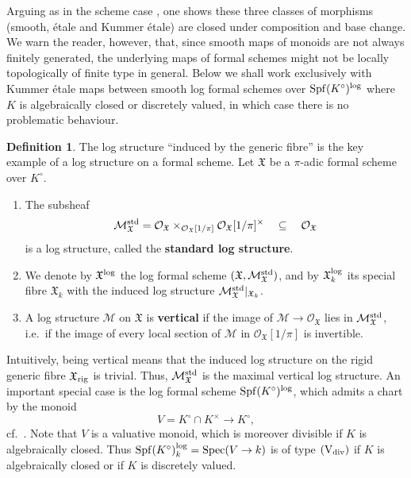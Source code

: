 \documentclass[a4paper,twoside,11pt,reqno]{amsart}
\newcommand{\cM}{{\mathcal M}}
\newcommand{\cO}{{\mathcal O}}
\newcommand{\fX}{{\mathfrak{X}}}
\newcommand{\la}{\longrightarrow}
\DeclareMathOperator{\Spec}{Spec}
\DeclareMathOperator{\Spf}{Spf}
\newcommand{\typeVd}{(\mathrm{V}_{\rm div})}
\theoremstyle{definition}
\newtheorem{defi}[thm]{Definition}
\numberwithin{equation}{subsection}
\begin{document}
Arguing as in the scheme case \cite[\S 3.5]{AHLS-Log}, one shows these three classes of morphisms (smooth, \'etale and Kummer \'etale) are closed under composition and base change. We warn the reader, however, that, since smooth maps of monoids are not always finitely generated,  the underlying maps of formal schemes might not be locally topologically of finite type in general. Below we shall work exclusively with Kummer \'etale maps between smooth log formal schemes over $\Spf(K^\circ)^{\rm log}$ where $K$ is algebraically closed or discretely valued, in which case there is no problematic behaviour. 

\begin{defi} \label{def:std-log-str}
    The log structure ``induced by the generic fibre'' is the key example of a log structure on a formal scheme.
    Let $\fX$ be a $\pi$-adic formal scheme over $K^\circ$. 
    \begin{enumerate}
        \item The subsheaf
        \[ 
            \cM_\fX^{\rm std} = \cO_\fX \times_{\cO_\fX[1/\pi]} \cO_\fX[1/\pi]^\times \quad\subseteq\quad \cO_\fX
        \]
        is a log structure, called the {\bf standard log structure}.
        \item We denote by $\fX^{\rm log}$ the log formal scheme $(\fX, \cM_\fX^{\rm std})$, and by $\fX^{\rm log}_k$ its special fibre $\fX_k$ with the induced log structure $\cM_\fX^{\rm std}|_{\fX_k}$. 
        \item A log structure $\cM$ on $\fX$ is {\bf vertical} if the image of $\cM\to\cO_\fX$ lies in $\cM_\fX^{\rm std}$, i.e.\ if the image of every local section of $\cM$ in $\cO_\fX[1/\pi]$ is invertible.
    \end{enumerate}
\end{defi}

Intuitively, being vertical means that the induced log structure on the rigid generic fibre $\fX_{\rm rig}$ is trivial.  Thus, $\cM_\fX^{\rm std}$ is the maximal vertical log structure. An important special case is the log formal scheme $\Spf(K^\circ)^{\rm log}$, which admits a chart by the monoid 
    \[
        V = K^\circ \cap K^\times \la K^\circ,
    \]
    cf.\ \cite[Lemma~4.4.1]{AHLS-Log}. Note that $V$ is a valuative monoid, which is moreover divisible if $K$ is algebraically closed. Thus $\Spf(K^\circ)_k^{\rm log} = \Spec(V\to k)$ is of type $\typeVd$ if $K$ is algebraically closed or if $K$ is discretely valued.
\end{document}
